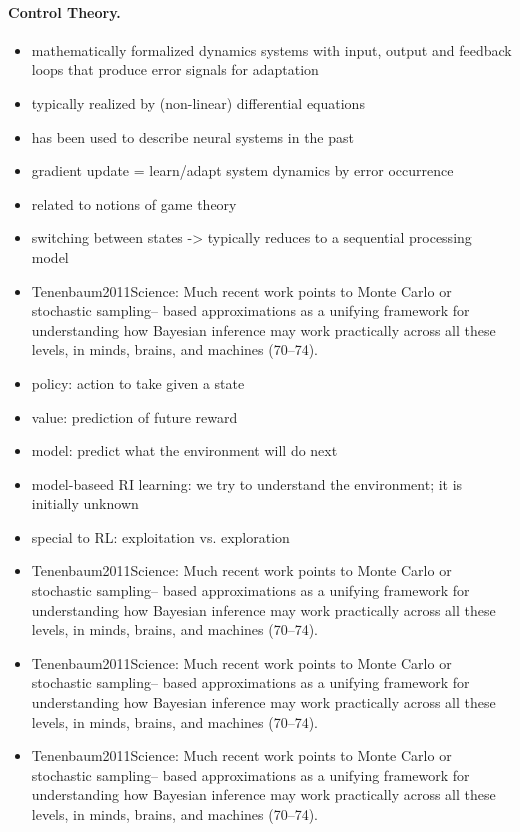 \documentclass{article} %
\begin{document}
\paragraph{Control Theory.}
\begin{itemize}
\item mathematically formalized dynamics systems with input, output and
feedback loops that produce error signals for adaptation
\item typically realized by (non-linear) differential equations
\item has been used to describe neural systems in the past
\item gradient update = learn/adapt system dynamics by error occurrence
\item related to notions of game theory
\item switching between states -> typically reduces to a sequential processing model
\item Tenenbaum2011Science: Much recent work points to Monte Carlo or stochastic sampling– based approximations as a unifying framework for understanding how Bayesian inference may work practically across all these levels, in minds, brains, and machines (70–74).
\item policy: action to take given a state
\item value: prediction of future reward
\item model: predict what the environment will do next
\item model-baseed RI learning: we try to understand the environment; it is initially unknown
\item special to RL: exploitation vs. exploration
\item Tenenbaum2011Science: Much recent work points to Monte Carlo or stochastic sampling– based approximations as a unifying framework for understanding how Bayesian inference may work practically across all these levels, in minds, brains, and machines (70–74).
\item Tenenbaum2011Science: Much recent work points to Monte Carlo or stochastic sampling– based approximations as a unifying framework for understanding how Bayesian inference may work practically across all these levels, in minds, brains, and machines (70–74).
\item Tenenbaum2011Science: Much recent work points to Monte Carlo or stochastic sampling– based approximations as a unifying framework for understanding how Bayesian inference may work practically across all these levels, in minds, brains, and machines (70–74).
\end{itemize}
\end{document}
